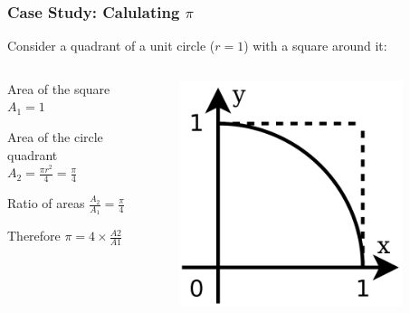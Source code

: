 \documentclass[14pt]{beamer}
\begin{document}
\begin{frame}
\frametitle{Case Study: Calulating $\pi$}
Consider a quadrant of a unit circle ($r=1$) with a square around it:
\begin{columns}
\begin{column}{0.5\textwidth}
\begin{itemize}
\small{
\item Area of the square $A_1 = 1$\\
\item Area of the circle quadrant $A_2 =\frac{\pi r^2}{4} = \frac{\pi}{4}$ \\
\item Ratio of areas $\frac{A_2}{A_1} = \frac{\pi}{4}$
\item Therefore $\pi = 4\times \frac{A2}{A1}$
}
\end{itemize}
\end{column}
\begin{column}{0.5\textwidth}
\begin{figure}
\includegraphics[width=0.9\textwidth]{pi.png}
\end{figure}
\end{column}
\end{columns}
\end{frame}
\end{document}
